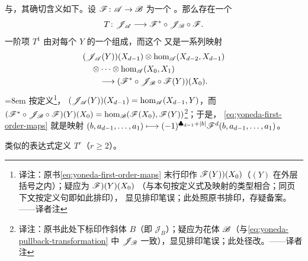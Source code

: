 \trYonedaEmbedding{}与\trPullback\trCompatible，其确切含义如下。设
$\mathscr{F}\colon\mathscr{A}\to\mathscr{B}$
为一个\trNonunital{} \trAFunctor。那么存在一个\trCanonical{}\trNaturalTransformation
\begin{equation}\label{eq:yoneda-pullback-transformation}
T\colon\mathscr{J}_{\mathscr{A}}\longrightarrow\mathscr{F}^*\circ\mathscr{J}_{\mathscr{B}}\circ\mathscr{F}.
\end{equation}
一阶项 $T^1$ 由对每个 $Y$ 的一个\trModule\trHomomorphism{}组成，而这个%
\trModule\trHomomorphism{}又是一系列映射
\begin{equation}\label{eq:yoneda-first-order-maps}
\begin{split}
&(\mathscr{J}_{\mathscr{A}}(Y))(X_{d-1})\otimes\hom_{\mathscr{A}}(X_{d-2},X_{d-1})\\
&\quad\otimes\cdots\otimes\hom_{\mathscr{A}}(X_0,X_1)\\
&\qquad\longrightarrow(\mathscr{F}^*\circ\mathscr{J}_{\mathscr{B}}\circ\mathscr{F}(Y))(X_0).
\end{split}
\end{equation}
\begingroup\emergencystretch=8em
按定义\footnote{译注：原书\eqref{eq:yoneda-first-order-maps} 末行印作
$\mathscr{F}(Y))(X_0)$（$(Y)$ 在外层括号之内）；疑应为 $\mathscr{F})(Y)(X_0)$
（与本句按定义式及映射的类型相合；同页下文按定义句即如此排印），
显见排印笔误；此处照原书排印，存疑备案。——译者注}，
$(\mathscr{J}_{\mathscr{A}}(Y))(X_{d-1})=\hom_{\mathscr{A}}(X_{d-1},Y)$，而
$(\mathscr{F}^*\circ\mathscr{J}_{\mathscr{B}}\circ\mathscr{F})(Y)(X_0)
=\hom_{\mathscr{B}}(\mathscr{F}(X_0),\mathscr{F}(Y))$\footnote{译注：原书此处下标印作斜体
$B$（即 $\mathcal{J}_B$）；疑应为花体 $\mathscr{B}$（与\eqref{eq:yoneda-pullback-transformation}
中 $\mathscr{J}_{\mathscr{B}}$ 一致），显见排印笔误；此处径改。——译者注}；于是，
\eqref{eq:yoneda-first-order-maps} 就是映射
$(b,a_{d-1},\ldots,a_1)\longmapsto(-1)^{\clubsuit_{d-1}+|b|}\mathscr{F}^d(b,a_{d-1},\ldots,a_1)$。
\par\endgroup
类似的表达式定义 $T^r$（$r\ge 2$）。


